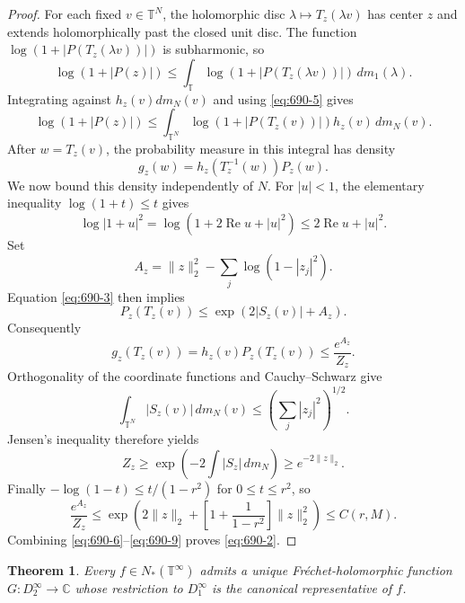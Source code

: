 \documentclass[11pt,a4paper]{article}
\newtheorem{theorem}{Theorem}[section]
\theoremstyle{remark}
\begin{document}
\begin{proof}
For each fixed $v\in\mathbb T^N$, the holomorphic disc
$\lambda\mapsto T_z(\lambda v)$ has center $z$ and extends
holomorphically past the closed unit disc.  The function
$\log(1+|P(T_z(\lambda v))|)$ is subharmonic, so
\[
 \log(1+|P(z)|)
 \le\int_{\mathbb T}
 \log(1+|P(T_z(\lambda v))|)\,dm_1(\lambda).
\]
Integrating against $h_z(v)dm_N(v)$ and using \eqref{eq:690-5} gives
\begin{equation}
 \log(1+|P(z)|)
 \le\int_{\mathbb T^N}
 \log(1+|P(T_z(v))|)h_z(v)\,dm_N(v).
 \label{eq:690-6}
\end{equation}
After $w=T_z(v)$, the probability measure in this integral has density
\[
 g_z(w)=h_z(T_z^{-1}(w))P_z(w).
\]
We now bound this density independently of $N$.
For $|u|<1$, the elementary inequality $\log(1+t)\le t$ gives
\[
 \log|1+u|^2
 =\log(1+2\operatorname{Re}u+|u|^2)
 \le2\operatorname{Re}u+|u|^2.
\]
Set
\[
 A_z=\|z\|_2^2-\sum_j\log(1-|z_j|^2).
\]
Equation \eqref{eq:690-3} then implies
\[
 P_z(T_z(v))\le\exp(2|S_z(v)|+A_z).
\]
Consequently
\begin{equation}
 g_z(T_z(v))
 =h_z(v)P_z(T_z(v))\le\frac{e^{A_z}}{Z_z}.
 \label{eq:690-7}
\end{equation}
Orthogonality of the coordinate functions and Cauchy--Schwarz give
\[
 \int_{\mathbb T^N}|S_z(v)|\,dm_N(v)
 \le\left(\sum_j|z_j|^2\right)^{1/2}.
\]
Jensen's inequality therefore yields
\begin{equation}
 Z_z\ge\exp\left(-2\int|S_z|\,dm_N\right)
 \ge e^{-2\|z\|_2}.
 \label{eq:690-8}
\end{equation}
Finally $-\log(1-t)\le t/(1-r^2)$ for $0\le t\le r^2$, so
\begin{equation}
 \frac{e^{A_z}}{Z_z}
 \le\exp\left(2\|z\|_2+
 \left[1+\frac1{1-r^2}\right]\|z\|_2^2\right)
 \le C(r,M).
 \label{eq:690-9}
\end{equation}
Combining \eqref{eq:690-6}--\eqref{eq:690-9} proves \eqref{eq:690-2}.
\end{proof}

\begin{theorem}
Every $f\in N_*(\mathbb T^\infty)$ admits a unique
Fr\'echet-holomorphic function $G:D_2^\infty\to\mathbb C$ whose
restriction to $D_1^\infty$ is the canonical representative of $f$.
\end{theorem}
\end{document}
